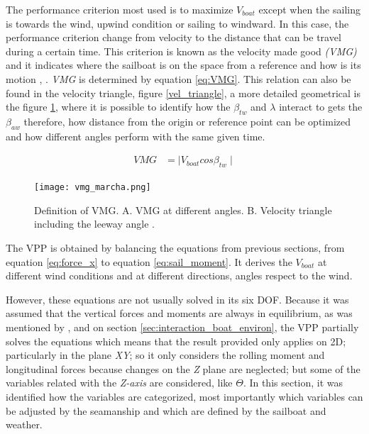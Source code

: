 The performance criterion most used is to maximize $V_{boat}$ except when the sailing is towards the wind, upwind condition or sailing to windward. In this case, the performance criterion change from velocity to the distance that can be travel during a certain time.  This criterion is known as the velocity made good \textit{(VMG)} and it indicates where the sailboat is on the space from a reference and how is its motion \cite{larsonprinciples}, \cite{marchajaereo1979} \cite{philpott1993yacht}. \textit{VMG} is determined by equation \ref{eq:VMG}. This relation can also be found in the velocity triangle, figure \ref{vel_triangle}, a more detailed geometrical is the figure \ref{fig:vmg_marchal_book}, where it is possible to identify how the $\beta_{tw}$ and $\lambda$ interact to gets the $\beta_{aw}$ therefore, how distance from the origin or reference point can be optimized and how different angles perform with the same given time. \par
{}

\begin{equation}\label{eq:VMG}
\begin{aligned}
VMG &=  \mid V_{boat} cos \beta_{tw} \mid 
\end{aligned}
\end {equation}

\begin{figure}
    \centering
    \texttt{[image: vmg\_marcha.png]}
    \caption{Definition of VMG. A. VMG at  different angles. B. Velocity triangle including the leeway angle \cite{marchajaereo1979}.}
    \label{fig:vmg_marchal_book}
\end{figure}

The VPP is obtained by balancing the equations from previous sections, from equation \ref{eq:force_x} to equation \ref{eq:sail_moment}. It derives the $V_{boat}$ at different wind conditions and at different directions, angles respect to the wind. 

However, these equations are not usually solved in its six DOF. Because it was assumed that the vertical forces and moments are always in equilibrium, as was mentioned by \cite{larsonprinciples}, \cite{fossati2009aero} and on section \ref{sec:interaction_boat_environ}, the VPP partially solves the equations which means that the result provided only applies on 2D; particularly in the plane \textit{XY}; so it only considers the rolling moment and longitudinal forces  because changes on the \textit{Z} plane are neglected; but some of the variables related with the \textit{Z-axis} are considered, like $\Theta$. In this section, it was identified how the variables are categorized, most importantly which variables can be adjusted by the seamanship and which are defined by the sailboat and weather. 


